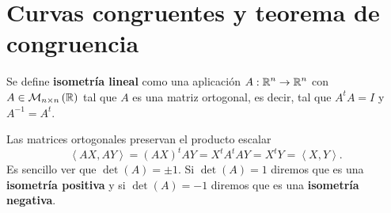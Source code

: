 \section{Curvas congruentes y teorema de congruencia}
\begin{definition}
Se define \textbf{isometría lineal} como una aplicación $\displaystyle A : \mathbb{R}^{n} \to \mathbb{R}^{n} $ con $\displaystyle A \in \mathcal{M}_{n \times n}\left(\mathbb{R}\right) $ tal que $\displaystyle A $ es una matriz ortogonal, es decir, tal que $\displaystyle A^{t}A = I $ y $\displaystyle A^{-1}=A^{t} $. 
\end{definition}
\begin{observation}
Las matrices ortogonales preservan el producto escalar 
\[\left\langle AX, AY \right\rangle =\left(AX\right)^{t}AY =X^{t}A^{t}AY = X^{t}Y = \left\langle X, Y \right\rangle .\]
Es sencillo ver que $\displaystyle \det\left(A\right)=\pm1 $. Si $\displaystyle \det\left(A\right)=1 $ diremos que es una \textbf{isometría positiva} y si $\displaystyle \det\left(A\right)=-1 $ diremos que es una \textbf{isometría negativa}. 
\end{observation}

